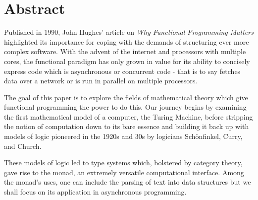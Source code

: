 \section{Abstract}
Published in 1990, John Hughes' article on {\it Why Functional Programming Matters} highlighted its importance for coping with the demands of structuring ever more complex software\cite{WhyFunctional}. With the advent of the internet and processors with multiple cores, the functional paradigm has only grown in value for its ability to concisely express code which is asynchronous or concurrent code - that is to say fetches data over a network or is run in parallel on multiple processors.

The goal of this paper is to explore the fields of mathematical theory which give functional programming the power to do this. Our journey begins by examining the first mathematical model of a computer, the Turing Machine, before stripping the notion of computation down to its bare essence and building it back up with models of logic pioneered in the 1920s and 30s by logicians Schönfinkel, Curry, and Church\cite{LambdaAndCombinatorsIntro}.

These models of logic led to type systems which, bolstered by category theory, gave rise to the monad, an extremely versatile computational interface. Among the monad's uses, one can include the parsing of text into data structures but we shall focus on its application in asynchronous programming.